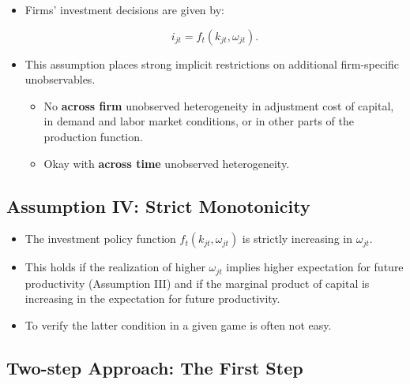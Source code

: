 \documentclass[]{book}
\providecommand{\tightlist}{%
  \setlength{\itemsep}{0pt}\setlength{\parskip}{0pt}}
\begin{document}
\begin{itemize}
\tightlist
\item
  Firms' investment decisions are given by:

  \begin{equation}
  i_{jt} = f_t(k_{jt}, \omega_{jt}).
  \end{equation}
\item
  This assumption places strong implicit restrictions on additional
  firm-specific unobservables.

  \begin{itemize}
  \tightlist
  \item
    No \textbf{across firm} unobserved heterogeneity in adjustment cost
    of capital, in demand and labor market conditions, or in other parts
    of the production function.
  \item
    Okay with \textbf{across time} unobserved heterogeneity.
  \end{itemize}
\end{itemize}

\subsection{Assumption IV: Strict
Monotonicity}\label{assumption-iv-strict-monotonicity}

\begin{itemize}
\tightlist
\item
  The investment policy function \(f_t(k_{jt}, \omega_{jt})\) is
  strictly increasing in \(\omega_{jt}\).
\item
  This holds if the realization of higher \(\omega_{jt}\) implies higher
  expectation for future productivity (Assumption III) and if the
  marginal product of capital is increasing in the expectation for
  future productivity.
\item
  To verify the latter condition in a given game is often not easy.
\end{itemize}

\subsection{Two-step Approach: The First
Step}\label{two-step-approach-the-first-step}
\end{document}
